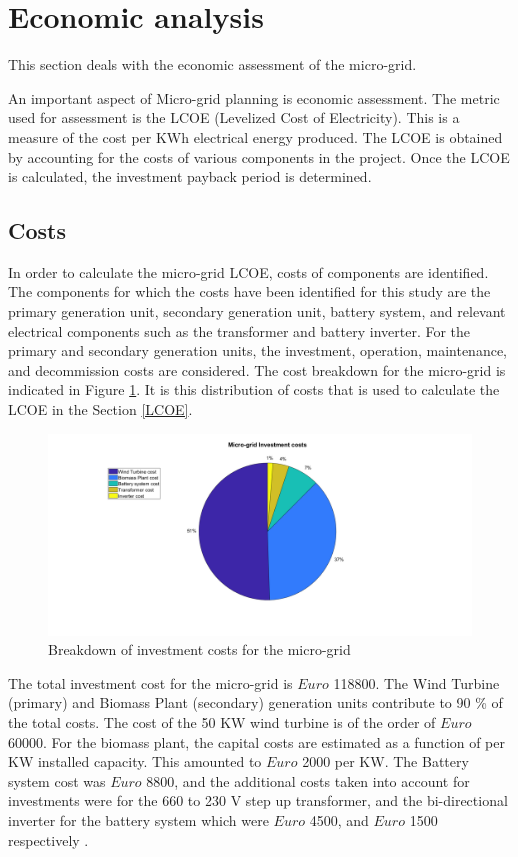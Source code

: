 \section{Economic analysis} \label{sec:eco}
This section deals with the economic assessment of the micro-grid. 

\noindent An important aspect of Micro-grid planning is economic assessment. The metric used for assessment is the LCOE (Levelized Cost of Electricity). This is a measure of the cost per KWh electrical energy produced. The LCOE is obtained by accounting for the costs of various components in the project. Once the LCOE is calculated, the investment payback period is determined.

\subsection{Costs}
In order to calculate the micro-grid LCOE, costs of components are identified. The components for which the costs have been identified for this study are the primary generation unit, secondary generation unit, battery system, and relevant electrical components such as the transformer and battery inverter. For the primary and secondary generation units, the investment, operation, maintenance, and decommission costs are considered. The cost breakdown for the micro-grid is indicated in Figure \ref{fig:mgtotal}. It is this distribution of costs that is used to calculate the LCOE in the Section \ref{LCOE}.

\begin{figure}[H]
    \centering
    \includegraphics[width=1.1 \linewidth]{Final_report/Images/mginvest.png}
    \caption{Breakdown of investment costs for the micro-grid}
    \label{fig:mgtotal}
\end{figure}

\noindent The total investment cost for the micro-grid is $ Euro $ 118800. The Wind Turbine (primary) and Biomass Plant (secondary) generation units contribute to 90 \% of the total costs. The cost of the 50 KW wind turbine is of the order of $ Euro $ 60000.  For the biomass plant, the capital costs are estimated as a function of per KW installed capacity. This amounted to $ Euro $ 2000 per KW\citep{wbdg_2016}. The Battery system cost was $ Euro $ 8800\citep{doyle_2018}, and the additional costs taken into account for investments were for the 660 to 230 V step up transformer, and the bi-directional inverter for the battery system which were $ Euro $ 4500, and $ Euro $ 1500 respectively \citep{Alibaba}.

